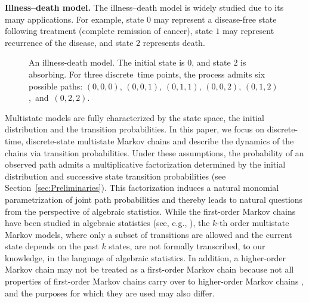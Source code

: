 \documentclass[11pt, a4paper]{article}
\numberwithin{equation}{section}
\theoremstyle{plain}
\theoremstyle{definition}
\begin{document}
\textbf{Illness–death model.} The illness–death model is widely studied due to its many applications. For example, state $0$ may represent a disease-free state following treatment (complete remission of cancer), state $1$ may represent recurrence of the disease, and state $2$ represents death.


\begin{figure}[!ht]
    \centering
{}
   \caption{An illness-death model. The initial state is $0$, and state $2$ is absorbing. For three discrete~time points, the process admits six possible paths: 
   $(0,0,0)$, $(0,0,1)$, $(0,1,1)$, $(0,0,2)$, $(0,1,2)$,~and~$(0,2,2)$.}
    \label{fig:illness}
\end{figure}

Multistate models are fully characterized by the state space, the initial distribution and the transition probabilities. In this paper, we focus on discrete-time, discrete-state multistate Markov chains and describe the dynamics of the chains via transition probabilities. Under these assumptions, the probability of an observed path admits a multiplicative factorization determined by the initial distribution and successive state transition probabilities (see Section~\ref{sec:Preliminaries}).
This factorization induces a natural monomial parametrization of joint path probabilities and thereby leads to natural questions from the perspective of algebraic statistics. While the first-order Markov chains have been studied in algebraic statistics (see, e.g., \cite[Section 1.1]{sullivant2023algebraic}), the $k$-th order multistate Markov models, where only a subset of transitions are allowed and the current state depends on the past $k$ states, are not formally transcribed, to our knowledge, in the language of algebraic statistics. In addition, a higher-order Markov chain may not be treated as a first-order Markov chain because not all properties of first-order Markov chains carry over to higher-order Markov chains \cite{Xu2026}, and the purposes for which they are used may also differ.
\end{document}
